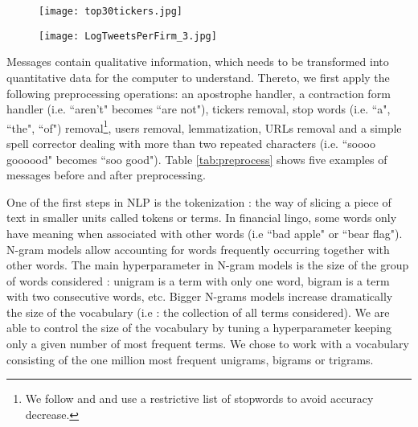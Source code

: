 \begin{figure*}[]
\centering
\begin{subfigure}{0.75\textwidth}  
            \centering 
            \texttt{[image: top30tickers.jpg]}
        \end{subfigure}
        \quad
        \begin{subfigure}{0.75\textwidth}   
            \centering 
            \texttt{[image: LogTweetsPerFirm\_3.jpg]}
        \end{subfigure}
        \label{fig:data-stocktwits2}
\end{figure*}

Messages contain qualitative information, which needs to be transformed into quantitative data for the computer to understand. Thereto, we first apply the following preprocessing operations: an apostrophe handler, a contraction form handler (i.e. ``aren't" becomes ``are not"), tickers removal, stop words (i.e. ``a", ``the", ``of") removal\footnote{We follow \citet{renault2020sentiment} and \citet{saif2014stopwords} and use a restrictive list of stopwords to avoid accuracy decrease.}, users removal, lemmatization, URLs removal and a simple spell corrector dealing with more than two repeated characters (i.e. ``soooo goooood" becomes ``soo good"). Table \ref{tab:preprocess} shows five examples of messages before and after preprocessing.
 
One of the first steps in NLP is the tokenization : the way of slicing a piece of text in smaller units called tokens or terms. In financial lingo, some words only have meaning when associated with other words (i.e ``bad apple" or ``bear flag"). N-gram models allow accounting for words frequently occurring together with other words. The main hyperparameter in N-gram models is the size of the group of words considered : unigram is a term with only one word, bigram is a term with two consecutive words, etc. Bigger N-grams models increase dramatically the size of the vocabulary (i.e : the collection of all terms considered). We are able to control the size of the vocabulary by tuning a hyperparameter keeping only a given number of most frequent terms.  We chose to work with a vocabulary consisting of the one million most frequent unigrams, bigrams or trigrams. 

